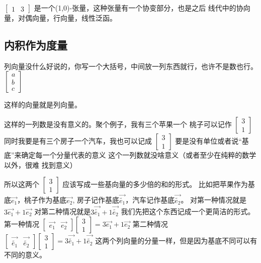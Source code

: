 \documentclass{book}
\begin{document}
\begin{CJK}{UTF8}{gbsn}
    $\left[\begin{matrix}
                1 & 3
            \end{matrix}\right]$
    是一个(1,0)-张量，这种张量有一个协变部分，也是之后
    线代中的协向量，对偶向量，行向量，线性泛函。

    \subsection{内积作为度量}
    列向量没什么好说的，你写一个大括号，中间放一列东西就行，也许不是数也行。
    $\left[\begin{matrix}
                a \\
                b \\
                c
            \end{matrix}\right]$

    这样的向量就是列向量。

    这样的一列数是没有意义的。聚个例子，我有三个苹果一个
    桃子可以记作
    $\left[\begin{matrix}
                3 \\
                1
            \end{matrix}\right]$
    同时我要是有三个房子一个汽车，我也可以记成
    $\left[\begin{matrix}
                3 \\
                1
            \end{matrix}\right]$
    要是没有单位或者说“基底”来确定每一个分量代表的意义
    这个一列数就没啥意义（或者至少在纯粹的数学以外，很难
    找到意义）

    所以这两个
    $\left[\begin{matrix}
                3 \\
                1
            \end{matrix}\right]$
    应该写成一些基向量的多少倍的和的形式。
    比如把苹果作为基底$\vec{e_1}$，桃子作为基底$\vec{e_2}$,
    房子记作基底$\vec{\tilde{e_1}}$，汽车记作基底$\vec{\tilde{e_2}}$。
    对第一种情况就是$3\vec{e_1}+1\vec{e_2}$
    对第二种情况就是$3\vec{\tilde{e_1}}+1\vec{\tilde{e_2}}$
    我们先把这个东西记成一个更简洁的形式。
    第一种情况
    $\left[\begin{matrix}
                \vec{e_1} & \vec{e_2}
            \end{matrix}\right]
        \left[\begin{matrix}
                3 \\
                1
            \end{matrix}\right]=3\vec{e_1}+1\vec{e_2}$
    第二种情况
    $\left[\begin{matrix}
                \vec{\tilde{e_1}} & \vec{\tilde{e_2}}
            \end{matrix}\right]
        \left[\begin{matrix}
                3 \\
                1
            \end{matrix}\right]=3\vec{\tilde{e_1}}+1\vec{\tilde{e_2}}$
    这两个列向量的分量一样，但是因为基底不同可以有
    不同的意义。



\end{CJK}
\end{document}
